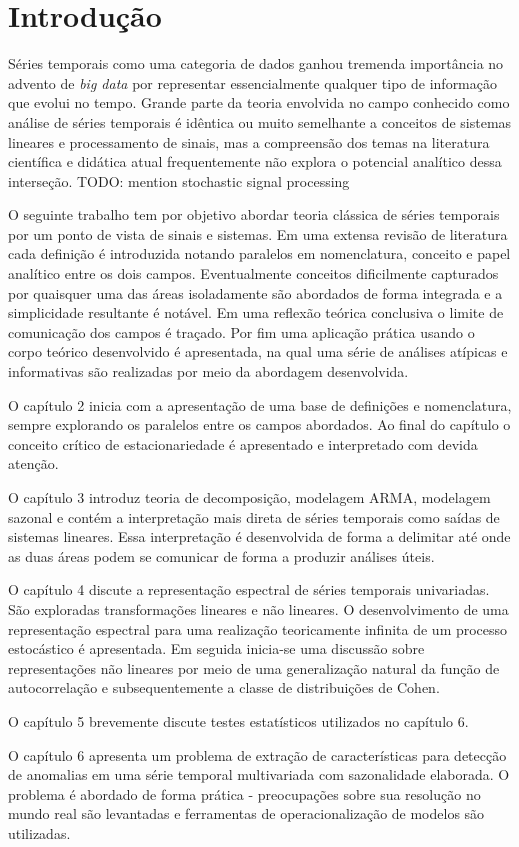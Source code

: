 \chapter{Introdução}
\label{cap:introducao}

Séries temporais como uma categoria de dados ganhou tremenda importância no
advento de \emph{big data} por representar essencialmente qualquer tipo de
informação que evolui no tempo. Grande parte da teoria envolvida no campo
conhecido como análise de séries temporais é idêntica ou muito semelhante a
conceitos de sistemas lineares e processamento de sinais, mas a compreensão dos
temas na literatura científica e didática atual frequentemente não explora o
potencial analítico dessa interseção.
TODO: mention stochastic signal processing

O seguinte trabalho tem por objetivo abordar teoria clássica de séries
temporais por um ponto de vista de sinais e sistemas. Em uma extensa revisão de
literatura cada definição é introduzida notando paralelos em nomenclatura,
conceito e papel analítico entre os dois campos. Eventualmente conceitos
dificilmente capturados por quaisquer uma das áreas isoladamente são abordados
de forma integrada e a simplicidade resultante é notável. Em uma reflexão
teórica conclusiva o limite de comunicação dos campos é traçado. Por fim uma
aplicação prática usando o corpo teórico desenvolvido é apresentada, na qual
uma série de análises atípicas e informativas são realizadas por meio da
abordagem desenvolvida.

O capítulo 2 inicia com a apresentação de uma base de definições e
nomenclatura, sempre explorando os paralelos entre os campos abordados. Ao
final do capítulo o conceito crítico de estacionariedade é apresentado e
interpretado com devida atenção.

O capítulo 3 introduz teoria de decomposição, modelagem ARMA, modelagem sazonal
e contém a interpretação mais direta de séries temporais como saídas de
sistemas lineares. Essa interpretação é desenvolvida de forma a delimitar até
onde as duas áreas podem se comunicar de forma a produzir análises úteis.

O capítulo 4 discute a representação espectral de séries temporais univariadas.
São exploradas transformações lineares e não lineares. O desenvolvimento de uma
representação espectral para uma realização teoricamente infinita de um
processo estocástico é apresentada. Em seguida inicia-se uma discussão sobre
representações não lineares por meio de uma generalização natural da função de
autocorrelação e subsequentemente a classe de distribuições de Cohen.

O capítulo 5 brevemente discute testes estatísticos utilizados no capítulo 6.

O capítulo 6 apresenta um problema de extração de características para detecção
de anomalias em uma série temporal multivariada com sazonalidade elaborada. O
problema é abordado de forma prática - preocupações sobre sua resolução no
mundo real são levantadas e ferramentas de operacionalização de modelos são
utilizadas.
